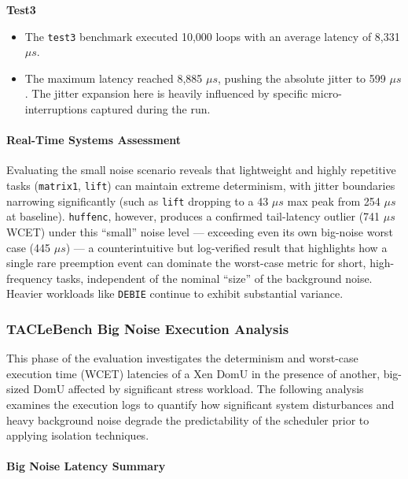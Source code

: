 \textbf{Test3}

\begin{itemize}
\item
  The \texttt{test3} benchmark executed 10,000 loops with an average
  latency of 8,331 $\mu s$.
\item
  The maximum latency reached 8,885 $\mu s$, pushing the absolute jitter to
  599 $\mu s$. The jitter expansion here is heavily influenced by specific
  micro-interruptions captured during the run.
\end{itemize}

\paragraph{Real-Time Systems
Assessment}\label{real-time-systems-assessment-5}

Evaluating the small noise scenario reveals that lightweight and highly
repetitive tasks (\texttt{matrix1}, \texttt{lift}) can maintain extreme
determinism, with jitter boundaries narrowing significantly (such as
\texttt{lift} dropping to a 43 $\mu s$ max peak from 254 $\mu s$ at baseline).
\texttt{huffenc}, however, produces a confirmed tail-latency outlier
(741 $\mu s$ WCET) under this ``small'' noise level --- exceeding even its
own big-noise worst case (445 $\mu s$) --- a counterintuitive but
log-verified result that highlights how a single rare preemption event
can dominate the worst-case metric for short, high-frequency tasks,
independent of the nominal ``size'' of the background noise. Heavier
workloads like \texttt{DEBIE} continue to exhibit substantial variance.

\subsubsection{TACLeBench Big Noise Execution
Analysis}\label{taclebench-big-noise-execution-analysis-1}

This phase of the evaluation investigates the determinism and worst-case
execution time (WCET) latencies of a Xen DomU in the presence of
another, big-sized DomU affected by significant stress workload. The
following analysis examines the execution logs to quantify how
significant system disturbances and heavy background noise degrade the
predictability of the scheduler prior to applying isolation techniques.

\paragraph{Big Noise Latency
Summary}\label{big-noise-latency-summary-1}

